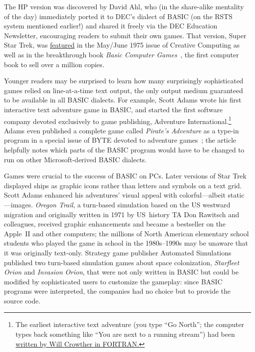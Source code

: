 
The HP version was discovered by David Ahl, who (in the share-alike mentality of the day)
immediately ported it to DEC's dialect of BASIC  (on the RSTS system
mentioned earlier!) and shared it freely via the DEC
Education Newsletter, encouraging readers to submit their own games.
That version, Super Star Trek, was
\href{https://archive.org/details/CreativeComputingv01n04MayJune1975/page/n41}{featured}
in the May/June 1975 issue of Creative Computing as well as in the
breakthrough book \emph{Basic Computer Games}~\cite{basic_computer_games}, the first computer book
to sell over a million copies.

Younger readers may be surprised to learn how many 
surprisingly sophisticated games relied on line-at-a-time text output,
the only output medium guaranteed to be available in all BASIC dialects.
For example, Scott Adams wrote his first interactive text adventure game
in BASIC, and started
the first software company devoted exclusively to game publishing,
Adventure International.\footnote{The earliest interactive text adventure (you type
``Go North''; the computer types back something like ``You are next to a
running stream'') had been
\href{https://armandofox.blogspot.com/2007/08/the-original-original-adventure.html}{written by Will Crowther in FORTRAN.}}
Adams even published a complete game called \emph{Pirate's Adventure} as
a type-in program in a special issue of BYTE devoted to adventure
games~\cite{byte80:adventure}; the article helpfully notes which parts
of the BASIC program would have to be changed to run on other
Microsoft-derived BASIC dialects.

Games were crucial to the success of BASIC on PCs.
Later versions of Star Trek displayed ships as graphic icons rather than
letters and symbols on a text grid.
Scott Adams enhanced his adventures' visual appeal with colorful---albeit
static---images.
\emph{Oregon Trail}, a turn-based simulation based on the US westward
migration and originally written in 1971 by US~history TA Don Rawitsch and colleagues,
received graphic enhancements and became
a bestseller on the Apple~II and other computers;
the millions of
North American elementary school students who played the game in school
in the 1980s--1990s
may be unaware that it was originally text-only.
Strategy game publisher
Automated Simulations published two turn-based simulation games about
space colonization,
\emph{Starfleet Orion} and \emph{Invasion Orion}, that were not only
written in BASIC but could be modified by sophisticated users to
customize the gameplay: since BASIC programs were interpreted, the
companies had no choice but to provide the source code.

